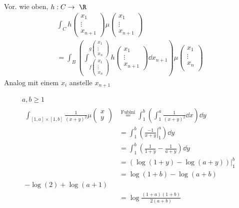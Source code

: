 \begin{satz*}[note = Fubini , index = Satz von Fubini , indexformat = {3!12~ 1!~23}]
	Vor. wie oben, $h: C \rightarrow \R$
	\[ \begin{multlined}
		\int_C h\begin{pmatrix} x_1 \\ \vdots \\ x_{n+1} \end{pmatrix} \mu\begin{pmatrix} x_1 \\ \vdots \\ x_{n+1} \end{pmatrix} \\
		= \int_B \left( \int_{f\begin{pmatrix} x_1 \\ \vdots \\ x_n \end{pmatrix}}^{g\begin{pmatrix} x_1 \\ \vdots \\ x_n \end{pmatrix}} h\begin{pmatrix} x_1 \\ \vdots \\ x_{n+1} \end{pmatrix} \dd x_{n+1} \right) \mu\begin{pmatrix} x_1 \\ \vdots \\ x_n \\ \end{pmatrix}
	\end{multlined} \]
	Analog mit einem $x_i$ anstelle $x_{n+1}$
\end{satz*}
\begin{bsp}
	\begin{gather*}
		a , b \geq 1 \\
		\begin{split}
			\int_{ [1,a] \times [1,b] } \frac{1}{(x+y)^2} \mu\begin{pmatrix} x \\ y \end{pmatrix}
				&\overset{\text{Fubini}}{=} \int_1^b \left( \int_1^a \frac{1}{(x+y)^2} \dd x \right) \dd y \\
				&= \int_1^b \left( \left. \frac{-1}{x+y} \right|_1^a \right) \dd y \\
				&= \int_1^b \left( \frac{1}{1+y} - \frac{1}{a+y} \right) \dd y \\
				&= ( \log(1+y) - \log(a+y) )|_1^b \\
				&= \log(1+b) - \log(a+b) \\
				- \log(2) + \log(a+1) \\
				&= \log \frac{(1+a)(1+b)}{2(a+b)}
		\end{split}
	\end{gather*}
\end{bsp}

